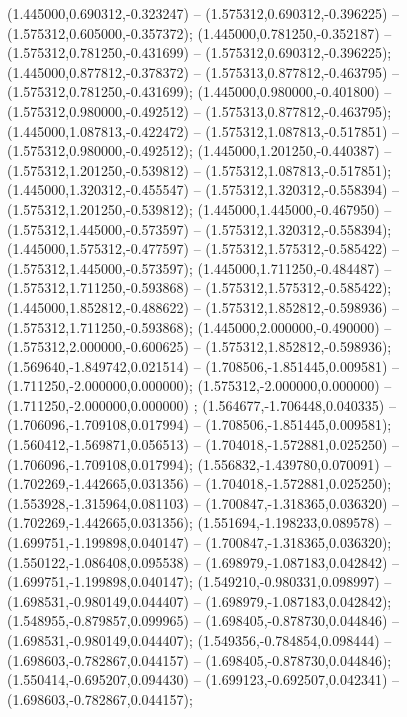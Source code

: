  (1.445000,0.690312,-0.323247) -- (1.575312,0.690312,-0.396225) -- (1.575312,0.605000,-0.357372);
 (1.445000,0.781250,-0.352187) -- (1.575312,0.781250,-0.431699) -- (1.575312,0.690312,-0.396225);
 (1.445000,0.877812,-0.378372) -- (1.575313,0.877812,-0.463795) -- (1.575312,0.781250,-0.431699);
 (1.445000,0.980000,-0.401800) -- (1.575312,0.980000,-0.492512) -- (1.575313,0.877812,-0.463795);
 (1.445000,1.087813,-0.422472) -- (1.575312,1.087813,-0.517851) -- (1.575312,0.980000,-0.492512);
 (1.445000,1.201250,-0.440387) -- (1.575312,1.201250,-0.539812) -- (1.575312,1.087813,-0.517851);
 (1.445000,1.320312,-0.455547) -- (1.575312,1.320312,-0.558394) -- (1.575312,1.201250,-0.539812);
 (1.445000,1.445000,-0.467950) -- (1.575312,1.445000,-0.573597) -- (1.575312,1.320312,-0.558394);
 (1.445000,1.575312,-0.477597) -- (1.575312,1.575312,-0.585422) -- (1.575312,1.445000,-0.573597);
 (1.445000,1.711250,-0.484487) -- (1.575312,1.711250,-0.593868) -- (1.575312,1.575312,-0.585422);
 (1.445000,1.852812,-0.488622) -- (1.575312,1.852812,-0.598936) -- (1.575312,1.711250,-0.593868);
 (1.445000,2.000000,-0.490000) -- (1.575312,2.000000,-0.600625) -- (1.575312,1.852812,-0.598936);
 (1.569640,-1.849742,0.021514) -- (1.708506,-1.851445,0.009581) -- (1.711250,-2.000000,0.000000);
 (1.575312,-2.000000,0.000000) -- (1.711250,-2.000000,0.000000) ;
 (1.564677,-1.706448,0.040335) -- (1.706096,-1.709108,0.017994) -- (1.708506,-1.851445,0.009581);
 (1.560412,-1.569871,0.056513) -- (1.704018,-1.572881,0.025250) -- (1.706096,-1.709108,0.017994);
 (1.556832,-1.439780,0.070091) -- (1.702269,-1.442665,0.031356) -- (1.704018,-1.572881,0.025250);
 (1.553928,-1.315964,0.081103) -- (1.700847,-1.318365,0.036320) -- (1.702269,-1.442665,0.031356);
 (1.551694,-1.198233,0.089578) -- (1.699751,-1.199898,0.040147) -- (1.700847,-1.318365,0.036320);
 (1.550122,-1.086408,0.095538) -- (1.698979,-1.087183,0.042842) -- (1.699751,-1.199898,0.040147);
 (1.549210,-0.980331,0.098997) -- (1.698531,-0.980149,0.044407) -- (1.698979,-1.087183,0.042842);
 (1.548955,-0.879857,0.099965) -- (1.698405,-0.878730,0.044846) -- (1.698531,-0.980149,0.044407);
 (1.549356,-0.784854,0.098444) -- (1.698603,-0.782867,0.044157) -- (1.698405,-0.878730,0.044846);
 (1.550414,-0.695207,0.094430) -- (1.699123,-0.692507,0.042341) -- (1.698603,-0.782867,0.044157);

